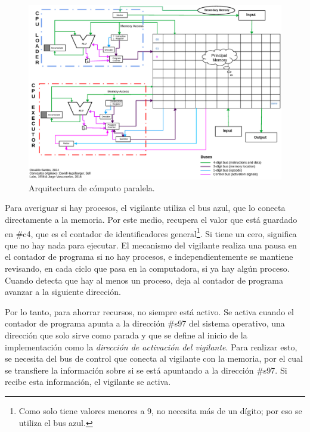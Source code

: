 \documentclass[letterpaper,12pt,oneside]{book}
\begin{document}
        \begin{figure}[H]		
			\centering
			\includegraphics[scale=0.63, angle=90]{media/Paralela/Arquitectura_diagrama_Paralelo.eps}
			\caption{ Arquitectura de cómputo paralela.}
			\label{fig:diag_arq_parallel}
		\end{figure}
  
		
		
	
  
        Para averiguar si hay procesos, el vigilante utiliza el bus azul, que lo conecta directamente a la memoria.
		Por este medio, recupera el valor que está guardado en \#c4, que es el contador de identificadores general\footnote{Como solo tiene valores 
		menores a 9,
		no necesita más de un dígito; por eso se utiliza el bus azul.}. Si tiene un cero, significa que no hay nada para ejecutar.
		El mecanismo del vigilante realiza una pausa en el contador de programa si no hay procesos, e independientemente
		se mantiene revisando, en cada ciclo que pasa en la computadora, si ya hay algún proceso. Cuando detecta que hay
		al menos un proceso, deja al contador de programa avanzar a la siguiente dirección.
		
		Por lo tanto, para ahorrar recursos, no siempre está activo. Se 
		activa cuando el contador de programa apunta a la dirección \#s97 del sistema operativo, una dirección que solo sirve como parada y que se 
		define 
		al inicio de la implementación como la \textit{dirección de activación del vigilante}. 
		Para realizar esto, se necesita del  bus de control que conecta al vigilante con la memoria, por el cual se transfiere 
		la información sobre si se está 
		apuntando a la dirección \#s97. Si recibe esta información, el vigilante se activa. 
		
\end{document}
